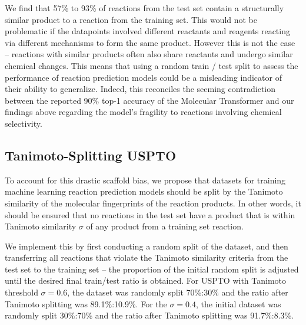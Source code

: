 We find that 57\% to 93\% of reactions from the test set contain a structurally similar product to a reaction from the training set. This would not be problematic if the datapoints involved different reactants and reagents reacting via different mechanisms to form the same product. However this is not the case -- reactions with similar products often also share reactants and undergo similar chemical changes. This means that using a random train / test split to assess the performance of reaction prediction models could be a misleading indicator of their ability to generalize. Indeed, this reconciles the seeming contradiction between the reported 90\% top-1 accuracy of the Molecular Transformer and our findings above regarding the model's fragility to reactions involving chemical selectivity.

\subsection{Tanimoto-Splitting USPTO}

To account for this drastic scaffold bias, we propose that datasets for training machine learning reaction prediction models should be split by the Tanimoto similarity of the molecular fingerprints of the reaction products. In other words, it should be ensured that no reactions in the test set have a product that is within Tanimoto similarity $\sigma$ of any product from a training set reaction.

We implement this by first conducting a random split of the dataset, and then transferring all reactions that violate the Tanimoto similarity criteria from the test set to the training set -- the proportion of the initial random split is adjusted until the desired final train/test ratio is obtained. For USPTO with Tanimoto threshold $\sigma=0.6$, the dataset was randomly split 70\%:30\% and the ratio after Tanimoto splitting was 89.1\%:10.9\%. For the $\sigma=0.4$, the initial dataset was randomly split 30\%:70\% and the ratio after Tanimoto splitting was 91.7\%:8.3\%. 

